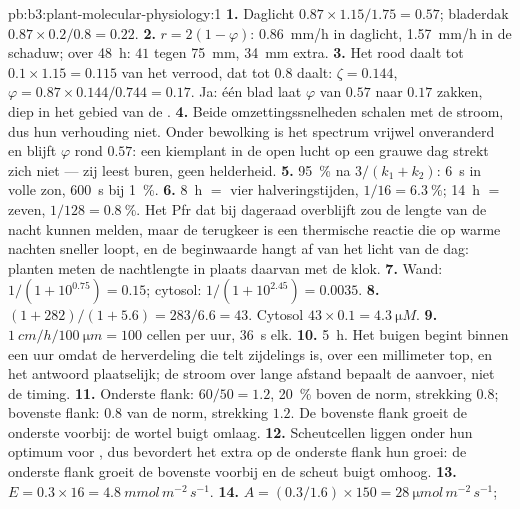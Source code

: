 \begin{solution}{pb:b3:plant-molecular-physiology:1}
\textbf{1.} Daglicht $0.87\times 1.15/1.75 = 0.57$; bladerdak $0.87\times
0.2/0.8 = 0.22$.
\textbf{2.} $r = 2(1 - \varphi)$: \qty{0.86}{mm/h} in daglicht,
\qty{1.57}{mm/h} in de schaduw; over \qty{48}{h}: $41$ tegen
\qty{75}{mm}, \qty{34}{mm} extra.
\textbf{3.} Het rood daalt tot $0.1\times 1.15 = 0.115$ van het
verrood, dat tot $0.8$ daalt: $\zeta = 0.144$, $\varphi = 0.87\times 0.144/0.744 =
0.17$. Ja: één blad laat $\varphi$ van $0.57$ naar $0.17$ zakken, diep
in het gebied van de .
\textbf{4.} Beide omzettingssnelheden schalen met de stroom, dus hun
verhouding niet. Onder bewolking is het spectrum vrijwel onveranderd en
blijft $\varphi$ rond $0.57$: een kiemplant in de open lucht op een
grauwe dag strekt zich niet --- zij leest buren, geen helderheid.
\textbf{5.} \qty{95}{\%} na $3/(k_{1} + k_{2})$: \qty{6}{s} in volle
zon, \qty{600}{s} bij \qty{1}{\%}.
\textbf{6.} \qty{8}{h} $=$ vier halveringstijden, $1/16 = \qty{6.3}{\%}$;
\qty{14}{h} $=$ zeven, $1/128 = \qty{0.8}{\%}$. Het Pfr dat bij
dageraad overblijft zou de lengte van de nacht kunnen melden, maar de
terugkeer is een thermische reactie die op warme nachten sneller loopt,
en de beginwaarde hangt af van het licht van de dag: planten meten de
nachtlengte in plaats daarvan met de klok.
\textbf{7.} Wand: $1/(1 + 10^{0.75}) = 0.15$; cytosol: $1/(1 +
10^{2.45}) = 0.0035$.
\textbf{8.} $(1 + 282)/(1 + 5.6) = 283/6.6 = 43$. Cytosol
$43\times 0.1 = \qty{4.3}{\micro M}$.
\textbf{9.} $\qty{1}{cm/h}/\qty{100}{\micro m} = 100$ cellen per uur,
\qty{36}{s} elk.
\textbf{10.} \qty{5}{h}. Het buigen begint binnen een uur omdat de
herverdeling die telt zijdelings is, over een millimeter top, en het
antwoord plaatselijk; de stroom over lange afstand bepaalt de aanvoer,
niet de timing.
\textbf{11.} Onderste flank: $60/50 = 1.2$,  \qty{20}{\%} boven
de norm, strekking $0.8$; bovenste flank: $0.8$ van de norm, strekking
$1.2$. De bovenste flank groeit de onderste voorbij: de wortel buigt
omlaag.
\textbf{12.} Scheutcellen liggen onder hun optimum voor , dus
bevordert het extra  op de onderste flank hun groei: de onderste
flank groeit de bovenste voorbij en de scheut buigt omhoog.
\textbf{13.} $E = 0.3\times 16 = \qty{4.8}{mmol\,m^{-2}\,s^{-1}}$.
\textbf{14.} $A = (0.3/1.6)\times 150 = \qty{28}{\micro mol\,m^{-2}\,s^{-1}}$;

\end{solution}
